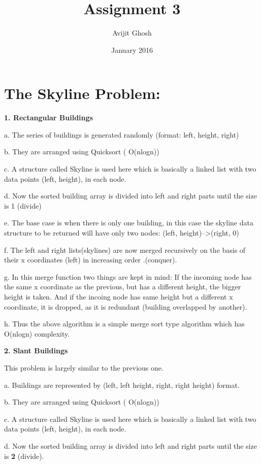 \documentclass{article}
\title{Assignment 3}
\author{Avijit Ghosh }
\date{January 2016}
\begin{document}
\maketitle

\section{The Skyline Problem:}
\textbf{\large{}1. Rectangular Buildings}{\large \par}


a. The series of buildings is generated randomly (format: left, height,
right)

b. They are arranged using Quicksort ( O(nlogn))

c. A structure called Skyline is used here which is basically a linked
list with two data points (left, height), in each node.

d. Now the sorted building array is divided into left and right parts
until the size is 1 (divide)

e. The base case is when there is only one building, in this case
the skyline data structure to be returned will have only two nodes:
(left, height)-->(right, 0)

f. The left and right lists(skylines) are now merged recursively on
the basis of their x coordinates (left) in increasing order .(conquer).

g. In this merge function two things are kept in mind: If the incoming
node has the same x coordinate as the previous, but has a different
height, the bigger height is taken. And if the incoing node has same
height but a different x coordinate, it is dropped, as it is redundant
(building overlapped by another). 

h. Thus the above algorithm is a simple merge sort type algorithm
which has O(nlogn) complexity.

\textbf{\large{}2. Slant Buildings}{\large \par}


This problem is largely similar to the previous one.

a. Buildings are represented by (left, left height, right, right height)
format.

b. They are arranged using Quicksort ( O(nlogn))

c. A structure called Skyline is used here which is basically a linked
list with two data points (left, height), in each node.

d. Now the sorted building array is divided into left and right parts
until the size is \textbf{\large{}2} (divide). 
\end{document}
